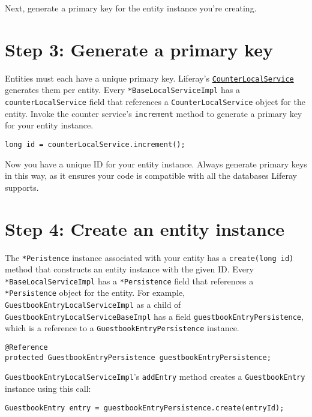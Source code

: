 Next, generate a primary key for the entity instance you're creating.

\section{Step 3: Generate a primary
key}\label{step-3-generate-a-primary-key}

Entities must each have a unique primary key. Liferay's
\href{https://docs.liferay.com/dxp/portal/7.2-latest/javadocs/portal-kernel/com/liferay/counter/kernel/service/CounterLocalService.html}{\texttt{CounterLocalService}}
generates them per entity. Every \texttt{*BaseLocalServiceImpl} has a
\texttt{counterLocalService} field that references a
\texttt{CounterLocalService} object for the entity. Invoke the counter
service's \texttt{increment} method to generate a primary key for your
entity instance.

\begin{verbatim}
long id = counterLocalService.increment();
\end{verbatim}

Now you have a unique ID for your entity instance. Always generate
primary keys in this way, as it ensures your code is compatible with all
the databases Liferay supports.

\section{Step 4: Create an entity
instance}\label{step-4-create-an-entity-instance}

The \texttt{*Peristence} instance associated with your entity has a
\texttt{create(long\ id)} method that constructs an entity instance with
the given ID. Every \texttt{*BaseLocalServiceImpl} has a
\texttt{*Persistence} field that references a \texttt{*Persistence}
object for the entity. For example,
\texttt{GuestbookEntryLocalServiceImpl} as a child of
\texttt{GuestbookEntryLocalServiceBaseImpl} has a field
\texttt{guestbookEntryPersistence}, which is a reference to a
\texttt{GuestbookEntryPersistence} instance.

\begin{verbatim}
@Reference
protected GuestbookEntryPersistence guestbookEntryPersistence;
\end{verbatim}

\texttt{GuestbookEntryLocalServiceImpl}'s \texttt{addEntry} method
creates a \texttt{GuestbookEntry} instance using this call:

\begin{verbatim}
GuestbookEntry entry = guestbookEntryPersistence.create(entryId);
\end{verbatim}

